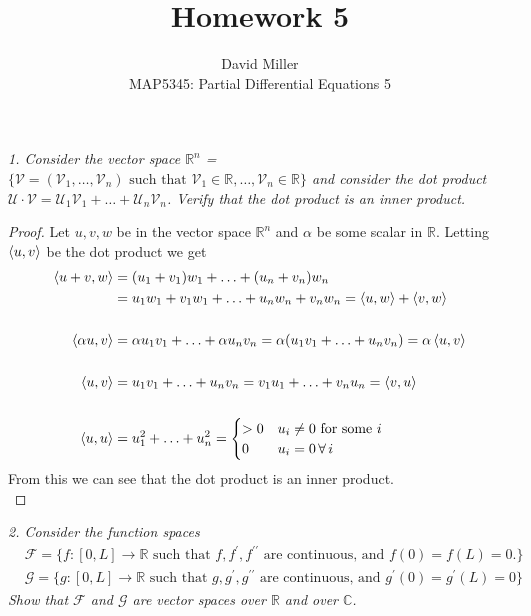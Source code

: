 \documentclass[12pt]{article}
\theoremstyle{remark}
\begin{document}
 
\title{Homework 5}
\author{David Miller \\ 
MAP5345: Partial Differential Equations 5} 
 
\maketitle

\textit{1. Consider the vector space $\mathbb{R}^n$ = $\{ {\scriptstyle{\mathcal{V}}} = ( {\scriptstyle{\mathcal{V}_1}}, \ldots, {\scriptstyle{\mathcal{V}_n}} ) \text{ such that } {\scriptstyle{\mathcal{V}_1}} \in \mathbb{R}, \ldots, {\scriptstyle{\mathcal{V}_n}} \in \mathbb{R} \}$ and consider the dot product ${\scriptstyle{\mathcal{U}}} \cdot {\scriptstyle{\mathcal{V}}} = {\scriptstyle{\mathcal{U}_1}}{\scriptstyle{\mathcal{V}_1}} + \ldots + {\scriptstyle{\mathcal{U}_n}}{\scriptstyle{\mathcal{V}_n}}$. Verify that the dot product is an inner product.} \\

\begin{proof}
Let $u,v, w$ be in the vector space $\mathbb{R}^n$ and $\alpha$ be some scalar in $\mathbb{R}$. Letting $\braket{u,v}$ be the dot product we get
\begin{align*}
	\braket{u + v, w} & = (u_1 + v_1)w_1 + \ldots + (u_n + v_n)w_n \\
	& = u_1w_1 + v_1w_1 + \ldots + u_nw_n + v_nw_n = \braket{u,w} + \braket{v,w} \\ \\
	\braket{\alpha u,v} & = \alpha u_1v_1 + \ldots + \alpha u_nv_n  = \alpha(u_1v_1 + \ldots + u_nv_n) = \alpha\braket{u,v} \\ \\
	\braket{u,v} & = u_1v_1 + \ldots + u_nv_n  = v_1u_1 + \ldots + v_nu_n = \braket{v,u} \\ \\
	\braket{u,u} & = u_1^2 + \ldots + u_n^2 = 
	\begin{cases}
	>0 & u_i \neq 0 \text{ for some } i \\
	0 & u_i = 0 \, \forall \, i
	\end{cases}
\end{align*}
From this we can see that the dot product is an inner product.  \\
\end{proof}

\newpage

\textit{2. Consider the function spaces}
\begin{align*}
& \mathcal{F} = \{ f: [0,L] \rightarrow \mathbb{R} \text{ such that  } f, f^\prime,f^{\prime\prime} \text{ are continuous, and } f(0) = f(L) = 0. \} \\
& \mathcal{G} = \{ g: [0,L] \rightarrow \mathbb{R} \text{ such that } g, g^\prime, g^{\prime\prime} \text{ are continuous, and } g^\prime(0) = g^\prime(L) = 0 \}
\end{align*}
\textit{Show that $\mathcal{F}$ and $\mathcal{G}$ are vector spaces over $\mathbb{R}$ and over $\mathbb{C}$.} \\
\end{document}

